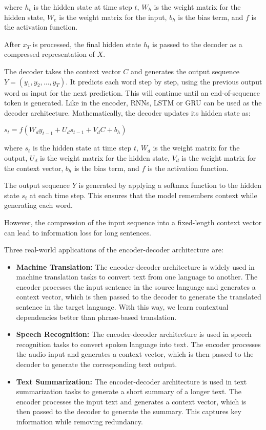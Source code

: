 \documentclass[10pt]{article}
\begin{document}
\begin{description}
where $h_t$ is the hidden state at time step $t$, $W_{h}$ is the weight matrix for the hidden state, $W_{e}$ is the weight matrix for the input, $b_h$ is the bias term, and $f$ is the activation function.

After $x_T$ is processed, the final hidden state $h_t$ is passed to the decoder as a compressed representation of $X$.

The decoder takes the context vector $C$ and generates the output sequence $Y = (y_1, y_2, ..., y_T)$.
It predicts each word step by step, using the previous output word as input for the next prediction.
This will continue until an end-of-sequence token is generated.
Like in the encoder, RNNs, LSTM or GRU can be used as the decoder architecture.
Mathematically, the decoder updates its hidden state as:

\begin{center}
    $s_t = f(W_{d}y_{t-1} + U_{d}s_{t-1} + V_{d}C + b_h)$
\end{center}

where $s_t$ is the hidden state at time step $t$, $W_{d}$ is the weight matrix for the output, $U_{d}$ is the weight matrix for the hidden state, $V_{d}$ is the weight matrix for the context vector, $b_h$ is the bias term, and $f$ is the activation function.

The output sequence $Y$ is generated by applying a softmax function to the hidden state $s_t$ at each time step.
This ensures that the model remembers context while generating each word.

However, the compression of the input sequence into a fixed-length context vector can lead to information loss for long sentences.

Three real-world applications of the encoder-decoder architecture are:

\begin{itemize}
    \item \textbf{Machine Translation:} The encoder-decoder architecture is widely used in machine translation tasks to convert text from one language to another.
    The encoder processes the input sentence in the source language and generates a context vector, which is then passed to the decoder to generate the translated sentence in the target language.
    With this way, we learn contextual dependencies better than phrase-based translation.
    \item \textbf{Speech Recognition:} The encoder-decoder architecture is used in speech recognition tasks to convert spoken language into text.
    The encoder processes the audio input and generates a context vector, which is then passed to the decoder to generate the corresponding text output. 
    \item \textbf{Text Summarization:} The encoder-decoder architecture is used in text summarization tasks to generate a short summary of a longer text.
    The encoder processes the input text and generates a context vector, which is then passed to the decoder to generate the summary. This captures key information while removing redundancy.
\end{itemize}


\end{description}
\end{document}

